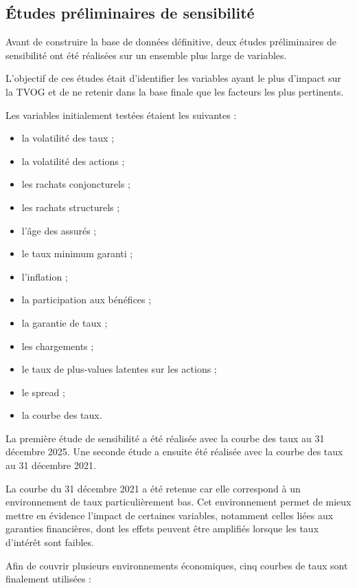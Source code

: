 \subsection{Études préliminaires de sensibilité}

Avant de construire la base de données définitive, deux études préliminaires de sensibilité ont été réalisées sur un ensemble plus large de variables.

L'objectif de ces études était d'identifier les variables ayant le plus d'impact sur la TVOG et de ne retenir dans la base finale que les facteurs les plus pertinents.

Les variables initialement testées étaient les suivantes :

\begin{itemize}
    \renewcommand{\labelitemi}{\textbullet}
    \item la volatilité des taux ;
    \item la volatilité des actions ;
    \item les rachats conjoncturels ;
    \item les rachats structurels ;
    \item l'âge des assurés ;
    \item le taux minimum garanti ;
    \item l'inflation ;
    \item la participation aux bénéfices ;
    \item la garantie de taux ;
    \item les chargements ;
    \item le taux de plus-values latentes sur les actions ;
    \item le spread ;
    \item la courbe des taux.
\end{itemize}

La première étude de sensibilité a été réalisée avec la courbe des taux au 31 décembre 2025. Une seconde étude a ensuite été réalisée avec la courbe des taux au 31 décembre 2021.

La courbe du 31 décembre 2021 a été retenue car elle correspond à un environnement de taux particulièrement bas. Cet environnement permet de mieux mettre en évidence l'impact de certaines variables, notamment celles liées aux garanties financières, dont les effets peuvent être amplifiés lorsque les taux d'intérêt sont faibles.

Afin de couvrir plusieurs environnements économiques, cinq courbes de taux sont finalement utilisées :

